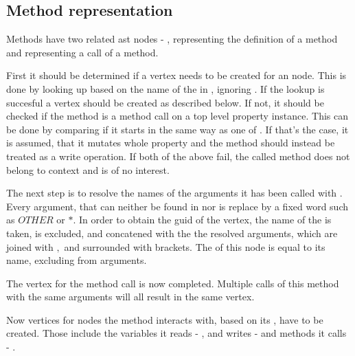 \subsection{Method representation}
\label{concept:methods}
Methods have two related \gls{ast} nodes - , representing the definition of a method and  representing a call of a method. 

First it should be determined if a vertex needs to be created for an  node. This is done by looking up based on the name of the  in , ignoring . If the lookup is succesful a vertex should be created as described below. If not, it should be checked if the method is a method call on a top level property instance. This can be done by comparing if it starts in the same way as one of . %
If that's the case, it is assumed, that it mutates whole property and the method should instead be treated as a write operation.
If both of the above fail, the called method does not belong to context and is of no interest.

The next step is to resolve the names of the arguments it has been called with . Every argument, that can neither be found in  nor  is replace by a fixed word such as $OTHER$ or $*$. In order to obtain the \gls{guid} of the vertex, the name of the  is taken,  is excluded, and concatened with the the resolved arguments, which are joined with $,$ and surrounded with brackets. The  of this node is equal to its name, excluding  from arguments. 

The vertex for the method call is now completed. Multiple calls of this method with the same arguments will all result in the same vertex.

Now vertices for nodes the method interacts with, based on its , have to be created. Those include the variables it reads - , and writes -  and methods it calls - . 

